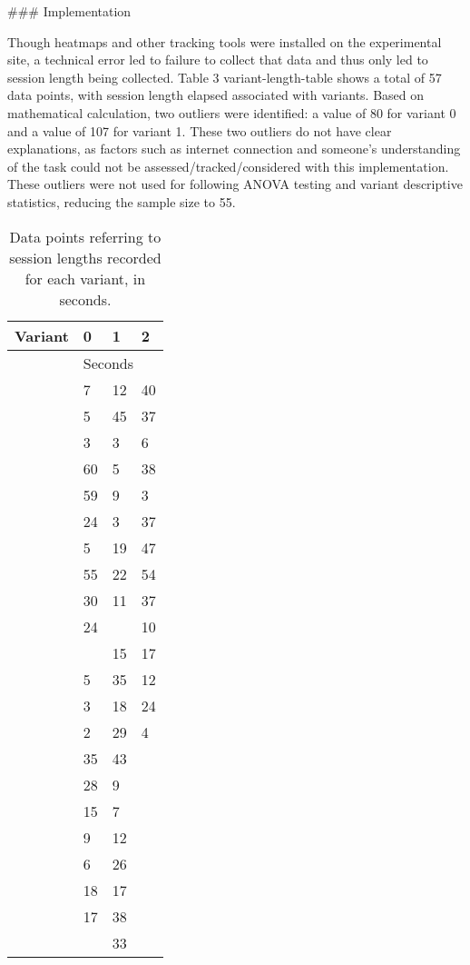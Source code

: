 ### Implementation

Though heatmaps and other tracking tools were installed on the experimental site, a technical error led to failure to collect that data and thus only led to session length being collected. Table 3 {variant-length-table} shows a total of 57 data points, with session length elapsed associated with variants. Based on mathematical calculation, two outliers were identified: a value of 80 for variant 0 and a value of 107 for variant 1. These two outliers do not have clear explanations, as factors such as internet connection and someone's understanding of the task could not be assessed/tracked/considered with this implementation. These outliers were not used for following ANOVA testing and variant descriptive statistics, reducing the sample size to 55.

\begin{table}[]
\caption{Data points referring to session lengths recorded for each variant, in seconds.}
\label{tab:my-table}
\begin{tabular}{@{}llll@{}}
\toprule
Variant & 0       & 1        & 2      \\ \midrule
        & \multicolumn{3}{l}{Seconds} \\ \cmidrule(l){2-4} 
        & 7       & 12       & 40     \\
        & 5       & 45       & 37     \\
        & 3       & 3        & 6      \\
        & 60      & 5        & 38     \\
        & 59      & 9        & 3      \\
        & 24      & 3        & 37     \\
        & 5       & 19       & 47     \\
        & 55      & 22       & 54     \\
        & 30      & 11       & 37     \\
        & 24      & \B 107      & 10     \\
        & \B 80      & 15       & 17     \\
        & 5       & 35       & 12     \\
        & 3       & 18       & 24     \\
        & 2       & 29       & 4      \\
        & 35      & 43       &        \\
        & 28      & 9        &        \\
        & 15      & 7        &        \\
        & 9       & 12       &        \\
        & 6       & 26       &        \\
        & 18      & 17       &        \\
        & 17      & 38       &        \\
        &         & 33       &        \\ \bottomrule
\end{tabular}
\end{table}


